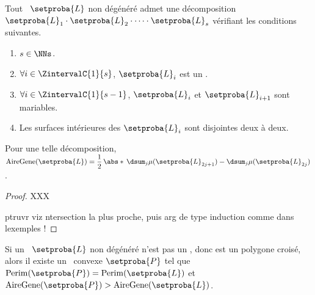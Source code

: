 \begin{fact} \label{ngone-trick}
    Tout \ncycle\ $\setproba{L}$ non dégénéré admet une décomposition
    $\setproba{L}_1 \cdot \setproba{L}_2 \cdot \dots \cdot \setproba{L}_s$ 
    vérifiant les conditions suivantes.
    \begin{enumerate}
    	\item $s \in \NNs$.

    	\item $\forall i \in \ZintervalC{1}{s}$, $\setproba{L}_i$ est un .
	
    	\item $\forall i \in \ZintervalC{1}{s-1}$, $\setproba{L}_i$ et $\setproba{L}_{i+1}$ sont mariables.

    	\item Les surfaces intérieures des $\setproba{L}_i$ sont disjointes deux à deux.
    \end{enumerate}
    
    Pour une telle décomposition, 
    $ \garea{\setproba{L}} 
    = \dfrac12 \, \abs*{\,
    	\dsum_{j} \mu(\setproba{L}_{2j + 1}) - \dsum_{j} \mu(\setproba{L}_{2j})
	  \,}$.
\end{fact}


\begin{proof}
    XXX
    
    ptruvr viz ntersection la plus proche, puis arg de type induction comme dans lexemples !
\end{proof}













\begin{fact} \label{no-cross-max}
    Si un \ncycle\ $\setproba{L}$ non dégénéré n'est pas un \ngone, donc est un polygone croisé, alors il existe un \ngone\ convexe $\setproba{P}$ tel que
	$\perim{\setproba{P}} = \perim{\setproba{L}}$
	et
	$\garea{\setproba{P}} > \garea{\setproba{L}}$.
\end{fact}



